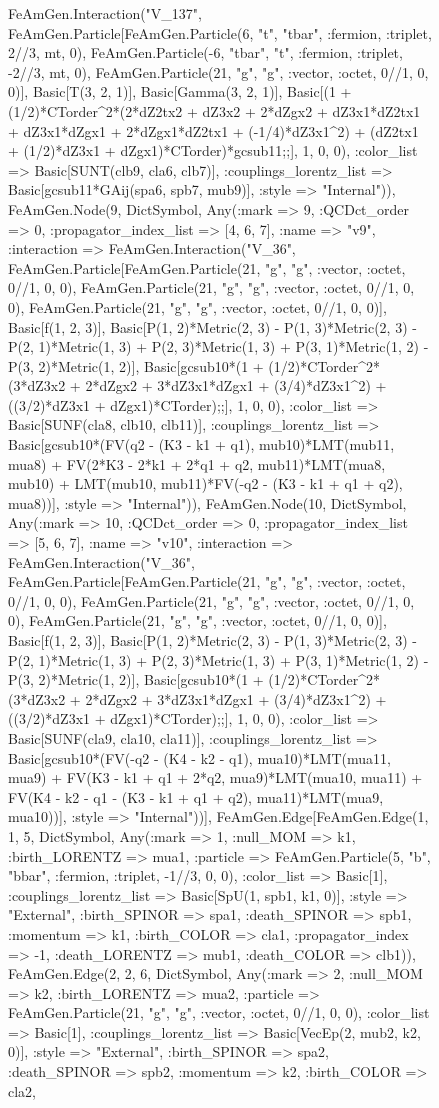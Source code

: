 \documentclass{revtex4}
\begin{document}
\begin{figure}[!htb]
\begin{center}
{FeAmGen.Interaction("V_137", FeAmGen.Particle[FeAmGen.Particle(6, "t", "tbar", :fermion, :triplet, 2//3, mt, 0), FeAmGen.Particle(-6, "tbar", "t", :fermion, :triplet, -2//3, mt, 0), FeAmGen.Particle(21, "g", "g", :vector, :octet, 0//1, 0, 0)], Basic[T(3, 2, 1)], Basic[Gamma(3, 2, 1)], Basic[(1 + (1/2)*CTorder^2*(2*dZ2tx2 + dZ3x2 + 2*dZgx2 + dZ3x1*dZ2tx1 + dZ3x1*dZgx1 + 2*dZgx1*dZ2tx1 + (-1/4)*dZ3x1^2) + (dZ2tx1 + (1/2)*dZ3x1 + dZgx1)*CTorder)*gcsub11;;], 1, 0, 0), :color_list => Basic[SUNT(clb9, cla6, clb7)], :couplings_lorentz_list => Basic[gcsub11*GAij(spa6, spb7, mub9)], :style => "Internal")), FeAmGen.Node(9, Dict{Symbol, Any}(:mark => 9, :QCDct_order => 0, :propagator_index_list => [4, 6, 7], :name => "v9", :interaction => FeAmGen.Interaction("V_36", FeAmGen.Particle[FeAmGen.Particle(21, "g", "g", :vector, :octet, 0//1, 0, 0), FeAmGen.Particle(21, "g", "g", :vector, :octet, 0//1, 0, 0), FeAmGen.Particle(21, "g", "g", :vector, :octet, 0//1, 0, 0)], Basic[f(1, 2, 3)], Basic[P(1, 2)*Metric(2, 3) - P(1, 3)*Metric(2, 3) - P(2, 1)*Metric(1, 3) + P(2, 3)*Metric(1, 3) + P(3, 1)*Metric(1, 2) - P(3, 2)*Metric(1, 2)], Basic[gcsub10*(1 + (1/2)*CTorder^2*(3*dZ3x2 + 2*dZgx2 + 3*dZ3x1*dZgx1 + (3/4)*dZ3x1^2) + ((3/2)*dZ3x1 + dZgx1)*CTorder);;], 1, 0, 0), :color_list => Basic[SUNF(cla8, clb10, clb11)], :couplings_lorentz_list => Basic[gcsub10*(FV(q2 - (K3 - k1 + q1), mub10)*LMT(mub11, mua8) + FV(2*K3 - 2*k1 + 2*q1 + q2, mub11)*LMT(mua8, mub10) + LMT(mub10, mub11)*FV(-q2 - (K3 - k1 + q1 + q2), mua8))], :style => "Internal")), FeAmGen.Node(10, Dict{Symbol, Any}(:mark => 10, :QCDct_order => 0, :propagator_index_list => [5, 6, 7], :name => "v10", :interaction => FeAmGen.Interaction("V_36", FeAmGen.Particle[FeAmGen.Particle(21, "g", "g", :vector, :octet, 0//1, 0, 0), FeAmGen.Particle(21, "g", "g", :vector, :octet, 0//1, 0, 0), FeAmGen.Particle(21, "g", "g", :vector, :octet, 0//1, 0, 0)], Basic[f(1, 2, 3)], Basic[P(1, 2)*Metric(2, 3) - P(1, 3)*Metric(2, 3) - P(2, 1)*Metric(1, 3) + P(2, 3)*Metric(1, 3) + P(3, 1)*Metric(1, 2) - P(3, 2)*Metric(1, 2)], Basic[gcsub10*(1 + (1/2)*CTorder^2*(3*dZ3x2 + 2*dZgx2 + 3*dZ3x1*dZgx1 + (3/4)*dZ3x1^2) + ((3/2)*dZ3x1 + dZgx1)*CTorder);;], 1, 0, 0), :color_list => Basic[SUNF(cla9, cla10, cla11)], :couplings_lorentz_list => Basic[gcsub10*(FV(-q2 - (K4 - k2 - q1), mua10)*LMT(mua11, mua9) + FV(K3 - k1 + q1 + 2*q2, mua9)*LMT(mua10, mua11) + FV(K4 - k2 - q1 - (K3 - k1 + q1 + q2), mua11)*LMT(mua9, mua10))], :style => "Internal"))], FeAmGen.Edge[FeAmGen.Edge(1, 1, 5, Dict{Symbol, Any}(:mark => 1, :null_MOM => k1, :birth_LORENTZ => mua1, :particle => FeAmGen.Particle(5, "b", "bbar", :fermion, :triplet, -1//3, 0, 0), :color_list => Basic[1], :couplings_lorentz_list => Basic[SpU(1, spb1, k1, 0)], :style => "External", :birth_SPINOR => spa1, :death_SPINOR => spb1, :momentum => k1, :birth_COLOR => cla1, :propagator_index => -1, :death_LORENTZ => mub1, :death_COLOR => clb1)), FeAmGen.Edge(2, 2, 6, Dict{Symbol, Any}(:mark => 2, :null_MOM => k2, :birth_LORENTZ => mua2, :particle => FeAmGen.Particle(21, "g", "g", :vector, :octet, 0//1, 0, 0), :color_list => Basic[1], :couplings_lorentz_list => Basic[VecEp(2, mub2, k2, 0)], :style => "External", :birth_SPINOR => spa2, :death_SPINOR => spb2, :momentum => k2, :birth_COLOR => cla2, }
\end{center}
\end{figure}
\end{document}
